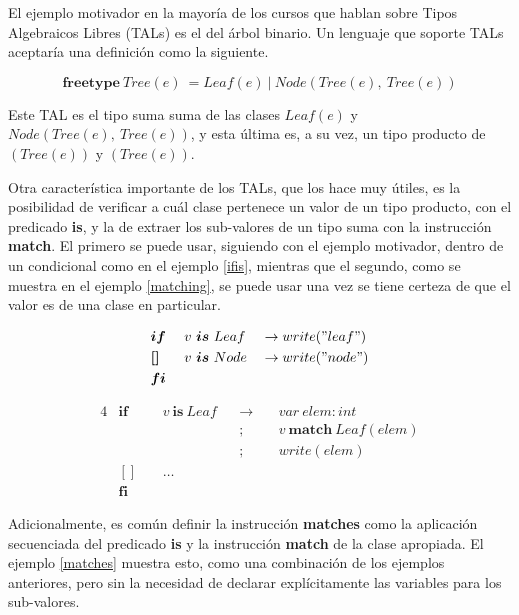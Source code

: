 El ejemplo motivador en la mayoría de los cursos que hablan sobre Tipos
Algebraicos Libres (TALs) es el del árbol binario. Un lenguaje que soporte TALs
aceptaría una definición como la siguiente.

$$ \textbf{freetype}\ Tree(e)\ = Leaf(e)\ |\ Node(Tree(e),\ Tree(e)) $$

Este TAL es el tipo suma suma de las clases
$Leaf(e)$ y $Node(Tree(e),\ Tree(e))$,
y esta última es, a su vez, un tipo producto de $(Tree(e))$ y $(Tree(e))$.

Otra característica importante de los TALs, que los hace muy útiles, es la
posibilidad de verificar a cuál clase pertenece un valor de un tipo producto,
con el predicado \textbf{is}, y la de extraer los sub-valores de un tipo suma
con la instrucción \textbf{match}. El primero se puede usar, siguiendo con el
ejemplo motivador, dentro de un condicional como en el ejemplo \ref{ifis},
mientras que el segundo, como se muestra en el ejemplo \ref{matching}, se puede
usar una vez se tiene certeza de que el valor es de una clase en particular.

\begin{alignat}{3}
&\boldsymbol{if}\ && v\ \boldsymbol{is}\ Leaf && \rightarrow write("leaf") \nonumber \\
&\boldsymbol{[]}\ && v\ \boldsymbol{is}\ Node && \rightarrow write("node") \label{ifis} \\
&\boldsymbol{fi} \nonumber
\end{alignat}

\begin{alignat}{4}
&\boldsymbol{if}\ && v\ \boldsymbol{is}\ Leaf && \rightarrow &&\ var\ elem : int                   \nonumber \\
&                 &&                          &&           ; &&\ v\ \boldsymbol{match}\ Leaf(elem) \nonumber \\
&                 &&                          &&           ; &&\ write (elem)                      \label{matching} \\
&\boldsymbol{[]}\ && \ldots                                                                        \nonumber \\
&\boldsymbol{fi}                                                                                   \nonumber
\end{alignat}

Adicionalmente, es común definir la instrucción \textbf{matches} 
como la aplicación secuenciada del predicado \textbf{is} y la instrucción
\textbf{match} de la clase apropiada. El ejemplo \ref{matches} muestra esto,
como una combinación de los ejemplos anteriores, pero sin la necesidad de
declarar explícitamente las variables para los sub-valores.

